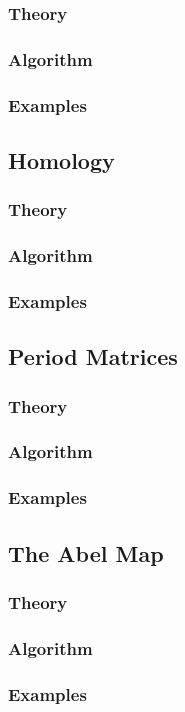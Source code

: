 %
\subsubsection*{Theory}
%
%
\subsubsection*{Algorithm}
%
%
\subsubsection*{Examples}
%

\subsection{Homology}

%
\subsubsection*{Theory}
%
%
\subsubsection*{Algorithm}
%
%
\subsubsection*{Examples}
%

\subsection{Period Matrices}

%
\subsubsection*{Theory}
%
%
\subsubsection*{Algorithm}
%
%
\subsubsection*{Examples}
%

\subsection{The Abel Map}

%
\subsubsection*{Theory}
%
%
\subsubsection*{Algorithm}
%
%
\subsubsection*{Examples}
%
